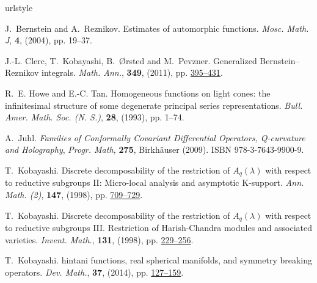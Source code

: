 \documentclass[reqno,12pt]{pja00} %
\theoremstyle{definition}
\theoremstyle{exampstyle} \newtheorem{examp}[theorem]{Theorem}
\begin{document}
\begin{thebibliography}{14}
\expandafter\ifx\csname urlstyle\endcsname\relax
  \providecommand{\doi}[1]{doi:\discretionary{}{}{}#1}\else
  \providecommand{\doi}{doi:\discretionary{}{}{}\begingroup
  \urlstyle{rm}\Url}\fi

J.~Bernstein and A.~Reznikov.
\newblock Estimates of automorphic functions.
\newblock \emph{{\normalfont Mosc. Math. J}}, \textbf{\textbf{4}}, (2004),
  pp. 19--37.

J.-L. Clerc, T.~Kobayashi, B.~{\O}rsted and M.~Pevzner.
\newblock Generalized {B}ernstein--{R}eznikov integrals.
\newblock \emph{{\normalfont Math. Ann.}}, \textbf{349}, (2011), pp.
\href{http://dx.doi.org/10.1007/s00208-010-0516-4}{395--431}.

R.~E. Howe and E.-C. Tan.
\newblock Homogeneous functions on light cones: the infinitesimal structure of
  some degenerate principal series representations.
\newblock \emph{{\normalfont Bull. Amer. Math. Soc. (N. S.)}}, \textbf{28},
  (1993), pp. 1--74.

A.~Juhl.
\newblock \emph{Families of {C}onformally {C}ovariant {D}ifferential
  {O}perators, {Q}-curvature and {H}olography}, \emph{{\normalfont Progr.
  Math},} \textbf{275},
\newblock Birkh{\"a}user (2009).
\newblock ISBN 978-3-7643-9900-9.

T.~Kobayashi.
\newblock Discrete decomposability of the restriction of {$A_q(\lambda)$} with
  respect to reductive subgroups {II}: Micro-local analysis and asymptotic
  {K}-support.
  \newblock \emph{{\normalfont Ann. Math. (2)}}, \textbf{147}, (1998), pp. \href{http://dx.doi.org/10.2307/120963}{709--729}.

T.~Kobayashi.
\newblock Discrete decomposability of the restriction of {$A_q(\lambda)$} with
  respect to reductive subgroups {III}. {R}estriction of {H}arish-{C}handra
  modules and associated varieties.
\newblock \emph{{\normalfont Invent. Math.}}, \textbf{131}, (1998), pp.
\href{http://dx.doi.org/10.1007/s002220050203}{229--256}.

T.~Kobayashi.
hintani functions, real spherical manifolds, and
  symmetry breaking operators.
  \newblock \emph{{\normalfont Dev. Math.}}, \textbf{37}, (2014), pp. \href{http://dx.doi.org/10.4171/OWR/2014/3}{127--159}.


\end{thebibliography}
\end{document}
